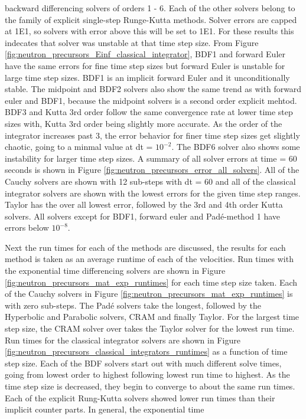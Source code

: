 \noindent backward differencing solvers of orders 1 - 6. Each of the other solvers belong to the family of explicit single-step Runge-Kutta methods. Solver errors are capped at 1E1, so solvers with error above this will be set to 1E1. For these results this indecates that solver was unstable at that time step size. From Figure \ref{fig:neutron_precursors_Einf_classical_integrator}, BDF1 and forward Euler have the same errors for fine time step sizes but forward Euler is unstable for large time step sizes. BDF1 is an implicit forward Euler and it unconditionally stable. The midpoint and BDF2 solvers also show the same trend as with forward euler and BDF1, because the midpoint solvers is a second order explicit mehtod. BDF3 and Kutta 3rd order follow the same convergence rate at lower time step sizes with, Kutta 3rd order being slightly more accurate. As the order of the integrator increases past 3, the error behavior for finer time step sizes get slightly chaotic, going to a minmal value at dt = $10^{-2}$. The BDF6 solver also shows some instability for larger time step sizes. A summary of all solver errors at time = 60 seconds is shown in Figure \ref{fig:neutron_precursors_error_all_solvers}. All of the Cauchy solvers are shown with 12 sub-steps with dt = 60 and all of the classical integrator solvers are shown with the lowest errors for the given time step ranges. Taylor has the over all lowest error, followed by the 3rd and 4th order Kutta solvers. All solvers except for BDF1, forward euler and Pad\'e-method 1 have errors below $10^{-8}$.

Next the run times for each of the methods are discussed, the results for each method is taken as an average runtime of each of the velocities. Run times with the exponential time differencing solvers are shown in Figure \ref{fig:neutron_precursors_mat_exp_runtimes} for each time step size taken. Each of the Cauchy solvers in Figure \ref{fig:neutron_precursors_mat_exp_runtimes} is with zero sub-steps. The Pad\'e solvers take the longest, followed by the Hyperbolic and Parabolic solvers, CRAM and finally Taylor. For the largest time step size, the CRAM solver over takes the Taylor solver for the lowest run time. Run times for the classical integrator solvers are shown in Figure \ref{fig:neutron_precursors_classical_integrators_runtimes} as a function of time step size. Each of the BDF solvers start out with much different solve times, going from lowest order to highest following lowest run time to highest. As the time step size is decreased, they begin to converge to about the same run times. Each of the explicit Rung-Kutta solvers showed lower run times than their implicit counter parts. In general, the exponential time 

